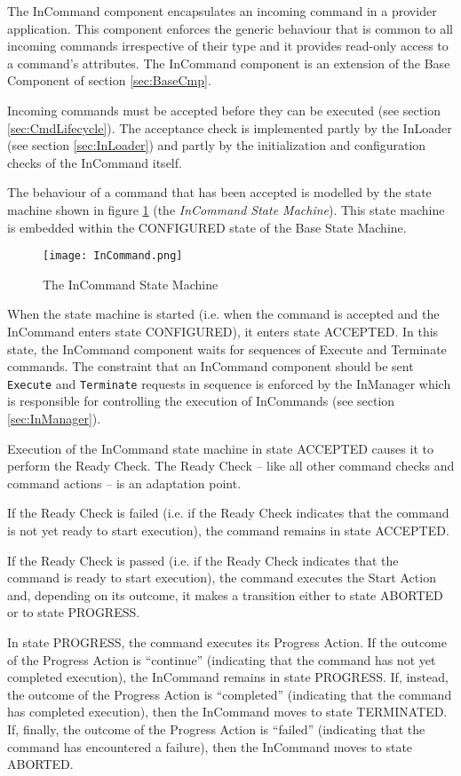 The InCommand component encapsulates an incoming command in a provider application. This component enforces the generic behaviour that is common to all incoming commands irrespective of their type and it provides read-only access to a command's attributes. The InCommand component is an extension of the Base Component of section \ref{sec:BaseCmp}. 

Incoming commands must be accepted before they can be executed (see section \ref{sec:CmdLifecycle}). The acceptance check is implemented partly by the InLoader (see section \ref{sec:InLoader}) and partly by the initialization and configuration checks of the InCommand itself.

The behaviour of a command that has been accepted is modelled by the state machine shown in figure \ref{fig:InCommand} (the \textit{InCommand State Machine}). This state machine is embedded within the CONFIGURED state of the Base State Machine. 

\begin{figure}[h]
 \centering
 \texttt{[image: InCommand.png]}
 \caption{The InCommand State Machine}
 \label{fig:InCommand}
\end{figure}

When the state machine is started (i.e. when the command is accepted and the InCommand enters state CONFIGURED), it enters state ACCEPTED. In this state, the InCommand component waits for sequences of Execute and Terminate commands. The constraint that an InCommand component should be sent \texttt{Execute} and \texttt{Terminate} requests in sequence is enforced by the InManager which is responsible for controlling the execution of InCommands (see section \ref{sec:InManager}).

Execution of the InCommand state machine in state ACCEPTED causes it to perform the Ready Check. The Ready Check – like all other command checks and command actions – is an adaptation point.  

If the Ready Check is failed (i.e. if the Ready Check indicates that the command is not yet ready to start execution), the command remains in state ACCEPTED.

If the Ready Check is passed (i.e. if the Ready Check indicates that the command is ready to start execution), the command executes the Start Action and, depending on its outcome, it makes a transition either to state ABORTED or to state PROGRESS.  

In state PROGRESS, the command executes its Progress Action. If the outcome of the Progress Action is “continue” (indicating that the command has not yet completed execution), the InCommand remains in state PROGRESS. If, instead, the outcome of the Progress Action is “completed” (indicating that the command has completed execution), then the InCommand moves to state TERMINATED. If, finally, the outcome of the Progress Action is “failed” (indicating that the command has encountered a failure), then the InCommand moves to state ABORTED. 

